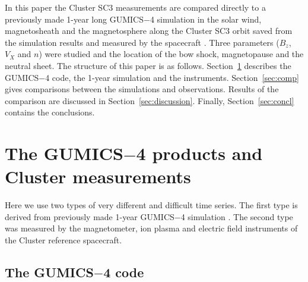 \documentclass[linenumbers,draft]{agujournal}
\begin{document}
In this paper the Cluster SC3 measurements are compared directly to a previously made 1-year long GUMICS$-$4 simulation in the solar wind, magnetosheath and the magnetosphere along the Cluster SC3 orbit saved from the simulation results and measured by the spacecraft \citep{facsko16:_one_earth}. Three parameters ($B_z$, $V_X$ and $n$) were studied and the location of the bow shock, magnetopause and the neutral sheet. The structure of this paper is as follows. Section~\ref{sec:data} describes the GUMICS$-$4 code, the 1-year simulation and the instruments. Section~\ref{sec:comp} gives comparisons between the simulations and observations. Results of the comparison are discussed in Section~\ref{sec:discussion}. Finally, Section~\ref{sec:concl} contains the conclusions.

\section{The GUMICS$-$4 products and Cluster measurements}
\label{sec:data}

Here we use two types of very different and difficult time series. The first type is derived from previously made 1-year GUMICS$-$4 simulation \citep{facsko16:_one_earth}. The second type was measured by the magnetometer, ion plasma and electric field instruments of the Cluster reference spacecraft.

\subsection{The GUMICS$-$4 code}
\label{sec:gumics}
\end{document}
